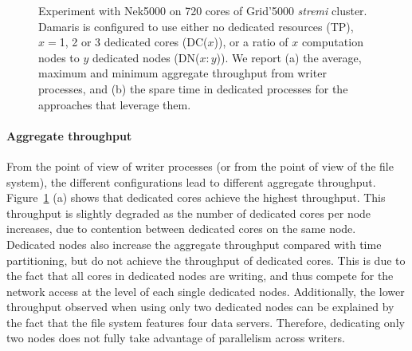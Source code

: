 \begin{figure}
	\begin{center}
	\quad
	\caption{Experiment with Nek5000 on 720 cores of Grid'5000 \emph{stremi} cluster. 
	Damaris is configured to use either no dedicated resources (TP), $x = $1, 2 or 3 dedicated cores (DC($x$)),
	or a ratio of $x$ computation nodes to $y$ dedicated nodes (DN($x:y$)). 
	We report (a) the average, maximum and minimum aggregate throughput
	from writer processes, and (b) the spare time in dedicated processes for the approaches that leverage them.}\label{fig:nek5dcdn2}
	\end{center}
\end{figure}

\paragraph{Aggregate throughput}
From the point of view of writer processes (or from the point of view of the file system),
the different configurations lead to different aggregate throughput. Figure~\ref{fig:nek5dcdn2} (a) shows that
dedicated cores achieve the highest throughput. This throughput is slightly degraded as the number of
dedicated cores per node increases, due to contention between dedicated cores on the same node.
Dedicated nodes also increase the aggregate throughput compared with time partitioning, but do not achieve
the throughput of dedicated cores. This is due to the fact that all cores in dedicated nodes are writing,
and thus compete for the network access at the level of each single dedicated nodes.
Additionally, the lower throughput observed when using only two dedicated nodes can be explained
by the fact that the file system features four data servers. Therefore, dedicating only two nodes does not
fully take advantage of parallelism across writers.

